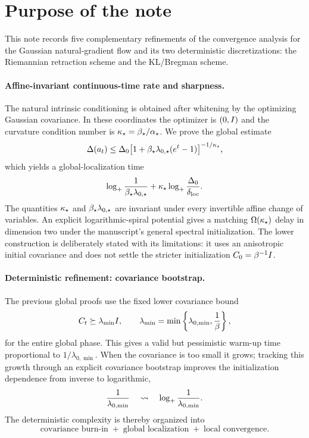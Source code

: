 \tableofcontents

\section{Purpose of the note}

This note records five complementary refinements of the convergence analysis for the Gaussian
natural-gradient flow and its two deterministic discretizations: the Riemannian retraction scheme
and the KL/Bregman scheme.

\paragraph{Affine-invariant continuous-time rate and sharpness.}
The natural intrinsic conditioning is obtained after whitening by the optimizing Gaussian
covariance.  In these coordinates the optimizer is $(0,I)$ and the curvature condition number is
$\kappa_\star=\beta_\star/\alpha_\star$.  We prove the global estimate
\[
    \Delta(a_t)
    \leq
    \Delta_0\bigl[1+\beta_\star\lambda_{0,\star}(e^t-1)\bigr]^{-1/\kappa_\star},
\]
which yields a global-localization time
\[
    \log_+\frac1{\beta_\star\lambda_{0,\star}}
    +\kappa_\star\log_+\frac{\Delta_0}{\delta_{\mathrm{loc}}}.
\]
The quantities $\kappa_\star$ and $\beta_\star\lambda_{0,\star}$ are invariant under every invertible
affine change of variables.  An explicit logarithmic-spiral potential gives a matching
$\Omega(\kappa_\star)$ delay in dimension two under the manuscript's general spectral
initialization.  The lower construction is deliberately stated with its limitations: it uses an
anisotropic initial covariance and does not settle the stricter initialization
$C_0=\beta^{-1}I$.

\paragraph{Deterministic refinement: covariance bootstrap.}
The previous global proofs use the fixed lower covariance bound
\[
    C_t\succeq \lambda_{\min}I,
    \qquad
    \lambda_{\min}=\min\left\{\lambda_{0,\min},\frac1\beta\right\},
\]
for the entire global phase.  This gives a valid but pessimistic warm-up time proportional to
$1/\lambda_{0,\min}$.  When the covariance is too small it grows; tracking this growth through an
explicit covariance bootstrap improves the initialization dependence from inverse to logarithmic,
\[
    \frac1{\lambda_{0,\min}}
    \quad\leadsto\quad
    \log_+\frac1{\lambda_{0,\min}}.
\]
The deterministic complexity is thereby organized into
\[
    \boxed{
    \text{covariance burn-in}
    \; + \;
    \text{global localization}
    \; + \;
    \text{local convergence}.}
\]

